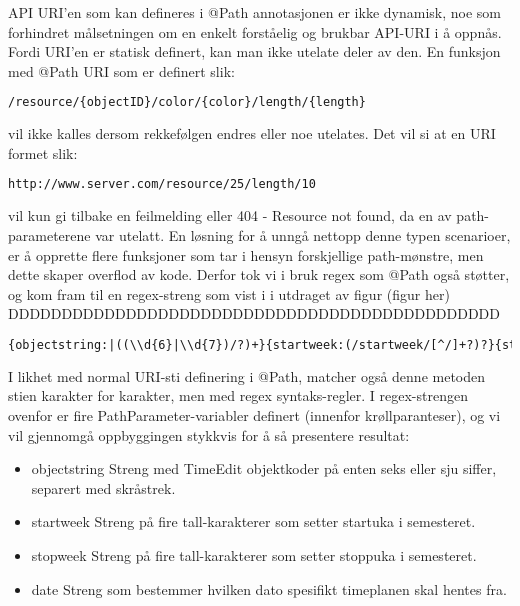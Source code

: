\documentclass[../main.tex]{subfiles}
\begin{document}
API URI’en som kan defineres i @Path annotasjonen er ikke dynamisk, noe som forhindret målsetningen om en enkelt forståelig og brukbar API-URI i å oppnås. Fordi URI’en er statisk definert, kan man ikke utelate deler av den. En funksjon med @Path URI som er definert slik:

\begin{lstlisting}[language=HTML, frame=single, caption={asdasdsadasdasdasdsadsadasdasdsadsa}]
/resource/{objectID}/color/{color}/length/{length}
\end{lstlisting}

vil ikke kalles dersom rekkefølgen endres eller noe utelates. Det vil si at en URI formet slik:

\begin{lstlisting}[language=HTML, frame=single, caption={asdasdsadasdasdasdsadsadasdasdsadsa}]
http://www.server.com/resource/25/length/10
\end{lstlisting}

vil kun gi tilbake en feilmelding eller 404 - Resource not found, da en av path-parameterene var utelatt. En løsning for å unngå nettopp denne typen scenarioer, er å opprette flere funksjoner som tar i hensyn forskjellige path-mønstre, men dette skaper overflod av kode.
Derfor tok vi i bruk regex som @Path også støtter, og kom fram til en regex-streng som vist i i utdraget av figur (figur her) DDDDDDDDDDDDDDDDDDDDDDDDDDDDDDDDDDDDDDDDDDDDDD

\begin{lstlisting}[language=HTML, frame=single, caption={asdasdsadasdasdasdsadsadasdasdsadsa}]
{objectstring:|((\\d{6}|\\d{7})/?)+}{startweek:(/startweek/[^/]+?)?}{stopweek:(/stopweek/[^/]+?)?}{date:(/date/[^/]+?)?}
\end{lstlisting}

I likhet med normal URI-sti definering i @Path, matcher også denne metoden stien karakter for karakter, men med regex syntaks-regler. I regex-strengen ovenfor er fire PathParameter-variabler definert (innenfor krøllparanteser), og vi vil gjennomgå oppbyggingen stykkvis for å så presentere resultat:

\begin{itemize}
\item objectstring \newline Streng med TimeEdit objektkoder på enten seks eller sju siffer, separert med skråstrek.
\item startweek \newline Streng på fire tall-karakterer som setter startuka i semesteret.
\item stopweek \newline Streng på fire tall-karakterer som setter stoppuka i semesteret.
\item date \newline Streng som bestemmer hvilken dato spesifikt timeplanen skal hentes fra.
\end{itemize}
\end{document}
